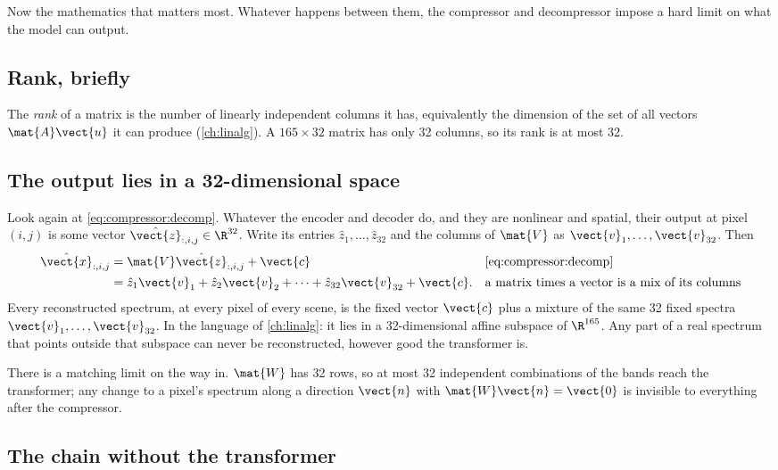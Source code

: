 Now the mathematics that matters most. Whatever happens between them, the compressor and decompressor
impose a hard limit on what the model can output.

\subsection{Rank, briefly}

The \emph{rank} of a matrix is the number of linearly independent columns it
has, equivalently the dimension of the set of all vectors $\mat{A}\vect{u}$ it can produce
(\cref{ch:linalg}). A $165\times32$ matrix has only 32 columns, so its rank is at most 32.

\subsection{The output lies in a 32-dimensional space}

Look again at \cref{eq:compressor:decomp}. Whatever the encoder and decoder do, and they are nonlinear
and spatial, their output at pixel $(i,j)$ is some vector $\hat{\vect{z}}_{:,i,j}\in\R^{32}$. Write its
entries $\hat{z}_1,\dots,\hat{z}_{32}$ and the columns of $\mat{V}$ as $\vect{v}_1,\dots,\vect{v}_{32}$.
Then
\begin{align}
\hat{\vect{x}}_{:,i,j} &= \mat{V}\hat{\vect{z}}_{:,i,j} + \vect{c}
  && \text{\cref{eq:compressor:decomp}}\notag\\
&= \hat{z}_1\vect{v}_1 + \hat{z}_2\vect{v}_2 + \dots + \hat{z}_{32}\vect{v}_{32} + \vect{c}.
  && \text{a matrix times a vector is a mix of its columns}\label{eq:compressor:span}
\end{align}
Every reconstructed spectrum, at every pixel of every scene, is the fixed vector $\vect{c}$ plus a
mixture of the same 32 fixed spectra $\vect{v}_1,\dots,\vect{v}_{32}$. In the language of
\cref{ch:linalg}: it lies in a 32-dimensional affine subspace of $\R^{165}$. Any part of a real spectrum
that points outside that subspace can never be reconstructed, however good the transformer is.

There is a matching limit on the way in. $\mat{W}$ has 32 rows, so at most 32 independent combinations
of the bands reach the transformer; any change to a pixel's spectrum along a direction $\vect{n}$ with
$\mat{W}\vect{n} = \vect{0}$ is invisible to everything after the compressor.

\subsection{The chain without the transformer}

